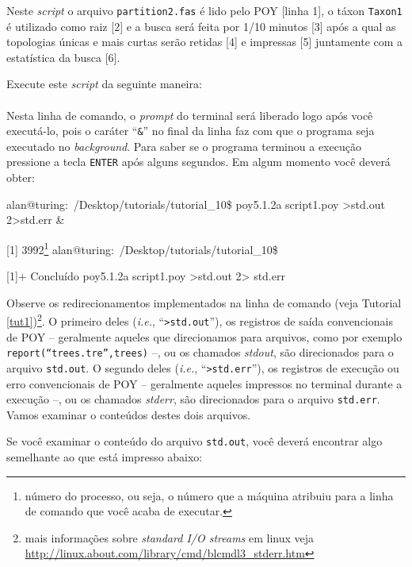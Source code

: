 \begin{refsection}
Neste \textit{script} o arquivo \texttt{partition2.fas} é lido pelo POY [linha 1], o táxon \texttt{Taxon1} é utilizado como raiz [2] e a busca será feita por 1/10 minutos [3] após a qual as topologias únicas e mais curtas serão retidas [4] e impressas [5] juntamente com a estatística da busca [6].

Execute este \textit{script} da seguinte maneira:\\

\\

Nesta linha de comando, o \textit{prompt} do terminal será liberado logo após você executá-lo, pois o caráter ``\texttt{\&}'' no final da linha faz com que o programa seja executado no \textit{background}. Para saber se o programa terminou a execução pressione a tecla \texttt{ENTER} após alguns segundos. Em algum momento você deverá obter:\\

\scriptsize

alan@turing:~/Desktop/tutorials/tutorial\_10\$ poy5.1.2a script1.poy >std.out 2>std.err \&

[1] 3992\footnote{ número do processo, ou seja, o número que a máquina atribuiu para a linha de comando que você acaba de executar.}
\vspace{20pt}
alan@turing:~/Desktop/tutorials/tutorial\_10\$ 

[1]+  Concluído              poy5.1.2a script1.poy >std.out 2> std.err\\

\normalsize

Observe os redirecionamentos implementados na linha de comando (veja Tutorial \ref{tut1})\footnote{ mais informações sobre \textit{standard I/O streams} em linux veja \url{http://linux.about.com/library/cmd/blcmdl3\_stderr.htm}}. O primeiro deles (\textit{i.e.}, ``\texttt{>std.out}''), os registros de saída convencionais de POY -- geralmente aqueles que direcionamos para arquivos, como por exemplo \texttt{report(``trees.tre'',trees)} --, ou os chamados \textit{stdout}, são direcionados para o arquivo \texttt{std.out}. O segundo deles (\textit{i.e.}, ``\texttt{>std.err}''), os registros de execução ou erro convencionais de POY -- geralmente aqueles impressos no terminal durante a execução --, ou os chamados \textit{stderr}, são direcionados para o arquivo \texttt{std.err}. Vamos examinar o conteúdos destes dois arquivos.

Se você examinar o conteúdo do arquivo \texttt{std.out}, você deverá encontrar algo semelhante ao que está impresso abaixo:



\end{refsection}
